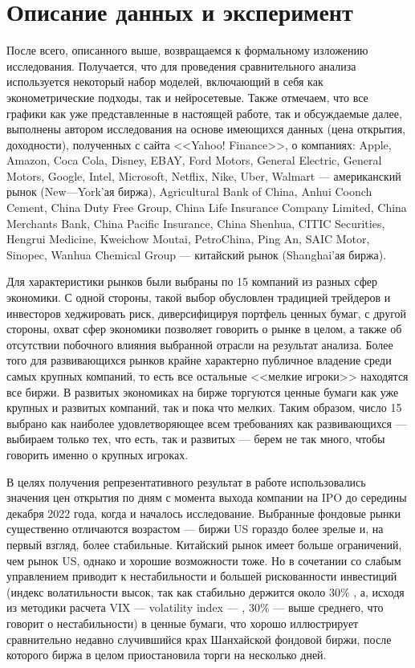 \section{Описание данных и эксперимент}
После всего, описанного выше, возвращаемся к формальному изложению исследования. Получается, что для проведения сравнительного анализа используется некоторый набор моделей, включающий в себя как эконометрические подходы, так и нейросетевые. Также отмечаем, что все графики как уже представленные в настоящей работе, так и обсуждаемые далее, выполнены автором исследования на основе имеющихся данных (цена открытия, доходности), полученных с сайта <<Yahoo! Finance>>, о компаниях: Apple, Amazon, Coca Cola, Disney, EBAY, Ford Motors, General Electric, General Motors, Google, Intel, Microsoft, Netflix, Nike, Uber, Walmart --- американский рынок (New---York'ая биржа), Agricultural Bank of China, Anhui Coonch Cement, China Duty Free Group, China Life Insurance Company Limited, China Merchants Bank, China Pacific Insurance, China Shenhua, CITIC Securities, Hengrui Medicine, Kweichow Moutai, PetroChina, Ping An, SAIC Motor, Sinopec, Wanhua Chemical Group --- китайский рынок (Shanghai'ая биржа).

Для характеристики рынков были выбраны по 15 компаний из разных сфер экономики. С одной стороны, такой выбор обусловлен традицией трейдеров и инвесторов хеджировать риск, диверсифицируя портфель ценных бумаг, с другой стороны, охват сфер экономики позволяет говорить о рынке в целом, а также об отсутствии побочного влияния выбранной отрасли на результат анализа. Более того для развивающихся рынков крайне характерно публичное владение среди самых крупных компаний, то есть все остальные <<мелкие игроки>> находятся все биржи. В развитых экономиках на бирже торгуются ценные бумаги как уже крупных и развитых компаний, так и пока что мелких. Таким образом, число 15 выбрано как наиболее удовлетворяющее всем требованиях как развивающихся --- выбираем только тех, что есть, так и развитых --- берем не так много, чтобы говорить именно о крупных игроках.

В целях получения репрезентативного результат в работе использовались значения цен открытия по дням с момента выхода компании на IPO до середины декабря 2022 года, когда и началось исследование. Выбранные фондовые рынки существенно отличаются возрастом --- биржи US гораздо более зрелые и, на первый взгляд, более стабильные. Китайский рынок имеет больше ограничений, чем рынок US, однако и хорошие возможности тоже. Но в сочетании со слабым управлением приводит к нестабильности и большей рискованности инвестиций (индекс волатильности высок, так как стабильно держится около $30\%$ \cite{ycharts2023ChinaETF}, а, исходя из методики расчета VIX --- volatility index --- \cite{finam2023VIX}, $30\%$ --- выше среднего, что говорит о нестабильности) в ценные бумаги, что хорошо иллюстрирует сравнительно недавно случившийся крах Шанхайской фондовой биржи, после которого биржа в целом приостановила торги на несколько дней. 

